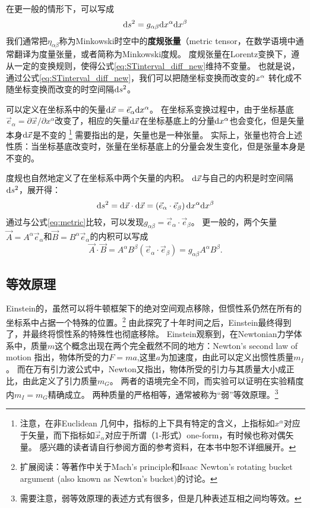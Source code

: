 在更一般的情形下，可以写成
\begin{equation}\label{eq:metric}
  {\rm d}s^2 = g_{\alpha \beta}{\rm d}x^\alpha {\rm d} x^\beta
\end{equation}
我们通常把$\eta_ {\alpha \beta}$称为Minkowski时空中的{\textbf{度规张量}}（metric tensor，在数学语境中通常翻译为度量张量，或者简称为Minkowski度规。
度规张量在Lorentz变换下，遵从一定的变换规则，使得公式\ref{eq:STinterval_diff_new}维持不变量。
也就是说，通过公式\ref{eq:STinterval_diff_new}，我们可以把随坐标变换而改变的${\rm }x^{\alpha} $ 转化成不随坐标变换而改变的时空间隔${\rm d} s^2$。

可以定义在坐标系中的矢量${\rm d}\vec{x} = \vec{e}_\alpha {\rm d}x^\alpha$。
在坐标系变换过程中，由于坐标基底$\vec{e}_\alpha = \partial \vec{x}/ \partial x^\alpha$改变了，相应的矢量${\rm d}\vec{x} $在坐标基底上的分量${\rm d}x^\alpha$也会变化，但是矢量本身${\rm d}\vec{x} $是不变的
\footnote{注意，在非Euclidean 几何中，指标的上下具有特定的含义，上指标如$x^\alpha$对应于矢量，而下指标如$\vec{x}_\alpha$对应于所谓（1-形式）one-form，有时候也称对偶矢量。
感兴趣的读者请自行参阅\GR 方面的参考资料，在本书中恕不详细展开。}
需要指出的是，矢量也是一种张量。
实际上，张量也符合上述性质：当坐标基底改变时，张量在坐标基底上的分量会发生变化，但是张量本身是不变的。

度规也自然地定义了在坐标系中两个矢量的内积。
${\rm d}\vec{x}$与自己的内积是时空间隔${\rm d}s^2$，展开得：
\begin{equation}\label{eq:InnerProduct1}
  {\rm d}s^2 =  {\rm d}\vec{x}\cdot{\rm d}\vec{x} = \left(\vec{e}_\alpha \cdot \vec{e}_\beta \right) {\rm d}x^\alpha {\rm d}x^\beta
\end{equation}
通过与公式\ref{eq:metric}比较，可以发现$g_{\alpha\beta} = \vec{e}_\alpha \cdot \vec{e}_\beta$。
更一般的，两个矢量$\vec{A} = A^\alpha \vec{e}_\alpha$和$\vec{B} = B^\alpha \vec{e}_\alpha$的内积可以写成
\begin{equation}\label{eq:InnerProduct2}
  \vec{A}\cdot\vec{B}= A^\alpha B^\beta \left(\vec{e}_\alpha \cdot \vec{e}_\beta \right) =  g_{\alpha \beta}A^\alpha B^\beta.
\end{equation}

\subsection{等效原理}
Einstein的\SR，虽然可以将牛顿框架下的绝对空间观点移除，但惯性系仍然在所有的坐标系中占据一个特殊的位置。\footnote{扩展阅读：\cite{Rindler:GR}等著作中关于Mach's principle和Isaac Newton's rotating bucket argument (also known as Newton's bucket)的讨论。}
由此探究了十年时间之后，Einstein最终得到了\GR ，并最终将惯性系的特殊性也彻底移除。
Einstein观察到，在Newtonian力学体系中，质量$m$这个概念出现在两个完全截然不同的地方：Newton's second law of motion 指出，物体所受的力$F=ma$,这里$a$为加速度，由此可以定义出惯性质量$m_I$。
而在万有引力波公式中，Newton又指出，物体所受的引力与其质量大小成正比，由此定义了引力质量$m_G$。
两者的语境完全不同，而实验可以证明在实验精度内$m_I = m_G$精确成立。
两种质量的严格相等，通常被称为“弱”等效原理。\footnote{需要注意，弱等效原理的表述方式有很多，但是几种表述互相之间均等效。}

